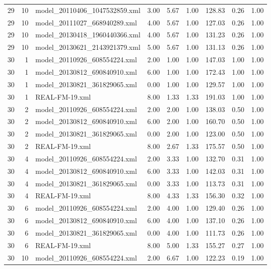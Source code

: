 \begin{table}[ht]
\begin{tabular}{rrlrrrrrr}
   29 &  10 & model\_20110406\_1047532859.xml & 3.00 & 5.67 & 1.00 & 128.83 & 0.26 & 1.00 \\ 
   29 &  10 & model\_20111027\_668940289.xml & 4.00 & 5.67 & 1.00 & 127.03 & 0.26 & 1.00 \\ 
   29 &  10 & model\_20130418\_1960440366.xml & 4.00 & 5.67 & 1.00 & 131.23 & 0.26 & 1.00 \\ 
   29 &  10 & model\_20130621\_2143921379.xml & 5.00 & 5.67 & 1.00 & 131.13 & 0.26 & 1.00 \\ 
   30 &   1 & model\_20110926\_608554224.xml & 2.00 & 1.00 & 1.00 & 147.03 & 1.00 & 1.00 \\ 
   30 &   1 & model\_20130812\_690840910.xml & 6.00 & 1.00 & 1.00 & 172.43 & 1.00 & 1.00 \\ 
   30 &   1 & model\_20130821\_361829065.xml & 0.00 & 1.00 & 1.00 & 129.57 & 1.00 & 1.00 \\ 
   30 &   1 & REAL-FM-19.xml & 8.00 & 1.33 & 1.33 & 191.03 & 1.00 & 1.00 \\ 
   30 &   2 & model\_20110926\_608554224.xml & 2.00 & 2.00 & 1.00 & 138.03 & 0.50 & 1.00 \\ 
   30 &   2 & model\_20130812\_690840910.xml & 6.00 & 2.00 & 1.00 & 160.70 & 0.50 & 1.00 \\ 
   30 &   2 & model\_20130821\_361829065.xml & 0.00 & 2.00 & 1.00 & 123.00 & 0.50 & 1.00 \\ 
   30 &   2 & REAL-FM-19.xml & 8.00 & 2.67 & 1.33 & 175.57 & 0.50 & 1.00 \\ 
   30 &   4 & model\_20110926\_608554224.xml & 2.00 & 3.33 & 1.00 & 132.70 & 0.31 & 1.00 \\ 
   30 &   4 & model\_20130812\_690840910.xml & 6.00 & 3.33 & 1.00 & 142.03 & 0.31 & 1.00 \\ 
   30 &   4 & model\_20130821\_361829065.xml & 0.00 & 3.33 & 1.00 & 113.73 & 0.31 & 1.00 \\ 
   30 &   4 & REAL-FM-19.xml & 8.00 & 4.33 & 1.33 & 156.30 & 0.32 & 1.00 \\ 
   30 &   6 & model\_20110926\_608554224.xml & 2.00 & 4.00 & 1.00 & 129.40 & 0.26 & 1.00 \\ 
   30 &   6 & model\_20130812\_690840910.xml & 6.00 & 4.00 & 1.00 & 137.10 & 0.26 & 1.00 \\ 
   30 &   6 & model\_20130821\_361829065.xml & 0.00 & 4.00 & 1.00 & 111.73 & 0.26 & 1.00 \\ 
   30 &   6 & REAL-FM-19.xml & 8.00 & 5.00 & 1.33 & 155.27 & 0.27 & 1.00 \\ 
   30 &  10 & model\_20110926\_608554224.xml & 2.00 & 6.67 & 1.00 & 122.23 & 0.19 & 1.00 \\ 

\end{tabular}
\end{table}
